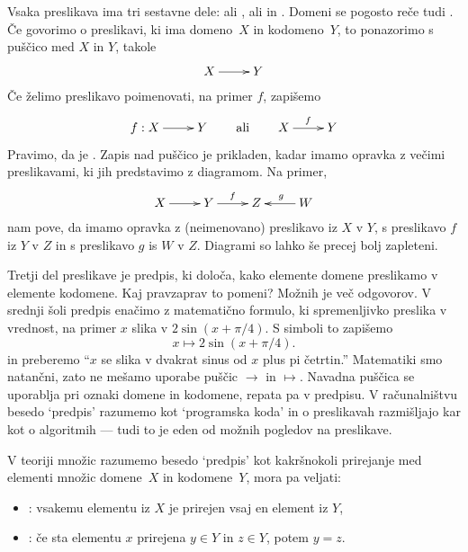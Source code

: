 Vsaka preslikava ima tri sestavne dele:  ali ,
 ali  in . Domeni se pogosto reče tudi
. Če govorimo o preslikavi, ki ima domeno~$X$ in kodomeno~$Y$, to
ponazorimo s puščico med $X$ in $Y$, takole
%
\begin{equation*}
  \xymatrix{
    {X} \ar[r] &
    {Y}
  }
\end{equation*}
%
Če želimo preslikavo poimenovati, na primer $f$, zapišemo
%
\begin{equation*}
  \xymatrix{
   {f : X} \ar[r] &
    {Y}
  }
  \qquad\text{ali}\qquad
  \xymatrix{
   {X} \ar[r]^{f} &
   {Y}
  }
\end{equation*}
%
Pravimo, da je . Zapis nad puščico je prikladen, kadar
imamo opravka z večimi preslikavami, ki jih predstavimo z diagramom. Na primer,
%
\begin{equation*}
  \xymatrix{
    {X} \ar[r] &
    {Y} \ar[r]^{f} &
    {Z}  &
    {W} \ar[l]_{g}
  }
\end{equation*}
%
nam pove, da imamo opravka z (neimenovano) preslikavo iz $X$ v $Y$, s preslikavo $f$ iz
$Y$ v $Z$ in s preslikavo $g$ is $W$ v $Z$. Diagrami so lahko še precej bolj zapleteni.

Tretji del preslikave je predpis, ki določa, kako elemente domene preslikamo v elemente
kodomene. Kaj pravzaprav to pomeni? Možnih je več odgovorov. V srednji šoli predpis
enačimo z matematično formulo, ki spremenljivko preslika v vrednost, na primer $x$ slika v
$2 \sin(x + \pi/4)$. S simboli to zapišemo
%
\begin{equation*}
  x \mapsto 2 \sin(x + \pi/4).
\end{equation*}
%
in preberemo ``$x$ se slika v dvakrat sinus od $x$ plus pi četrtin.''
%
Matematiki smo natančni, zato ne mešamo uporabe puščic $\to$ in $\mapsto$. Navadna puščica
se uporablja pri oznaki domene in kodomene, repata pa v predpisu. V računalništvu besedo
`predpis' razumemo kot `programska koda' in o preslikavah razmišljajo kar kot o
algoritmih --- tudi to je eden od možnih pogledov na preslikave.

V teoriji množic razumemo besedo `predpis' kot kakršnokoli prirejanje med elementi množic
domene~$X$ in kodomene~$Y$, mora pa veljati:
%
\begin{itemize}
\item {}: vsakemu elementu iz $X$ je prirejen vsaj en element iz $Y$,
\item {}: če sta elementu $x$ prirejena $y \in Y$ in $z \in Y$, potem $y = z$.
\end{itemize}

